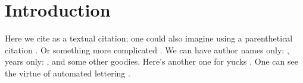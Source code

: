 





\section{Introduction}

Here we cite \citet{smiths1} as a textual citation; one could
also imagine using a parenthetical citation \citep{baker:95b}.
Or something more complicated \citep[see e.g.][p.~32]{smiths2}.
We can have author names only: \citeauthor{baker:99}, years
only: \citeyear{baker:95}, and some other goodies.  Here's 
another one for yucks \citep{foo:72}.  One can see the virtue
of automated lettering \citep[e.g.,][]{smiths1,smiths2}.





